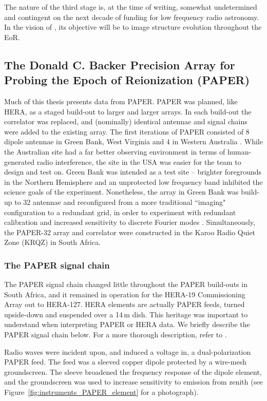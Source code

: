 The nature of the third stage is, at the time of writing, somewhat undetermined and contingent on the next decade of funding for low frequency radio astronomy. In the vision of \cite{HERAWhitePaper}, its objective will be to image structure evolution throughout the EoR.

\subsection{The Donald C. Backer Precision Array for Probing the Epoch of Reionization (PAPER)}
\label{subsec:paper_instrument}

Much of this thesis presents data from PAPER. PAPER was planned, like HERA, as a staged build-out to larger and larger arrays. In each build-out the correlator was replaced, and (nominally) identical antennae and signal chains were added to the existing array. The first iterations of PAPER consisted of 8 dipole antennae in Green Bank, West Virginia and 4 in Western Australia \citep{Parsons.10}. While the Australian site had a far better observing environment in terms of human-generated radio interference, the site in the USA was easier for the team to design and test on. Green Bank was intended as a test site -- brighter foregrounds in the Northern Hemisphere and an unprotected low frequency band inhibited the science goals of the experiment. Nonetheless, the array in Green Bank was build-up to 32 antennae and reconfigured from a more traditional ``imaging" configuration to a redundant grid, in order to experiment with redundant calibration and increased sensitivity to discrete Fourier modes \citep{Parsons.12b, Pober.12}. Simultaneously, the PAPER-32 array and correlator were constructed in the Karoo Radio Quiet Zone (KRQZ) in South Africa.

\subsubsection{The PAPER signal chain}

The PAPER signal chain changed little throughout the PAPER build-outs in South Africa, and it remained in operation for the HERA-19 Commissioning Array out to HERA-127. HERA elements are actually PAPER feeds, turned upside-down and suspended over a 14\,m dish. This heritage was important to understand when interpreting PAPER or HERA data. We briefly describe the PAPER signal chain below. For a more thorough description, refer to \cite{Parsons.10}.

Radio waves were incident upon, and induced a voltage in, a dual-polarization PAPER feed. The feed was a sleeved copper dipole protected by a wire-mesh groundscreen. The sleeve broadened the frequency response of the dipole element, and the groundscreen was used to increase sensitivity to emission from zenith (see Figure~\ref{fig:instruments_PAPER_element} for a photograph).

